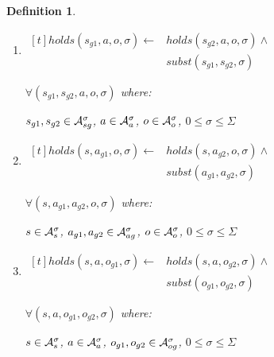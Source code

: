 \documentclass[10pt, twocolumn]{article}
\newtheorem{definition}{Definition}
\begin{document}
\begin{definition}
\begin{enumerate}
                $\forall (s, a, o_{s}, o_{g}, \sigma)$ where:

                $s \in {\cal A}^{\sigma}_{s}$,
                $a \in {\cal A}^{\sigma}_{a}$,
                $o_{s} \in {\cal A}^{\sigma}_{os}$,
                $o_{g} \in {\cal A}^{\sigma}_{og}$,
                $0 \leq \sigma \leq \Sigma$
              \item
                \begin{math}
                  \begin{aligned}[t]
                    holds(s_{g1}, a, o, \sigma) \leftarrow &
                    holds(s_{g2}, a, o, \sigma) \land \\
                    & subst(s_{g1}, s_{g2}, \sigma)
                  \end{aligned}
                \end{math}

                $\forall (s_{g1}, s_{g2}, a, o, \sigma)$ where:

                $s_{g1}, s_{g2} \in {\cal A}^{\sigma}_{sg}$,
                $a \in {\cal A}^{\sigma}_{a}$,
                $o \in {\cal A}^{\sigma}_{o}$,
                $0 \leq \sigma \leq \Sigma$
              \item
                \begin{math}
                  \begin{aligned}[t]
                    holds(s, a_{g1}, o, \sigma) \leftarrow &
                    holds(s, a_{g2}, o, \sigma) \land \\
                    & subst(a_{g1}, a_{g2}, \sigma)
                  \end{aligned}
                \end{math}

                $\forall (s, a_{g1}, a_{g2}, o, \sigma)$ where:

                $s \in {\cal A}^{\sigma}_{s}$,
                $a_{g1}, a_{g2} \in {\cal A}^{\sigma}_{ag}$,
                $o \in {\cal A}^{\sigma}_{o}$,
                $0 \leq \sigma \leq \Sigma$
              \item
                \begin{math}
                  \begin{aligned}[t]
                    holds(s, a, o_{g1}, \sigma) \leftarrow &
                    holds(s, a, o_{g2}, \sigma) \land \\
                    & subst(o_{g1}, o_{g2}, \sigma)
                  \end{aligned}
                \end{math}

                $\forall (s, a, o_{g1}, o_{g2}, \sigma)$ where:

                $s \in {\cal A}^{\sigma}_{s}$,
                $a \in {\cal A}^{\sigma}_{a}$,
                $o_{g1}, o_{g2} \in {\cal A}^{\sigma}_{og}$,
                $0 \leq \sigma \leq \Sigma$
            \end{enumerate}
          \end{definition}
\end{document}
